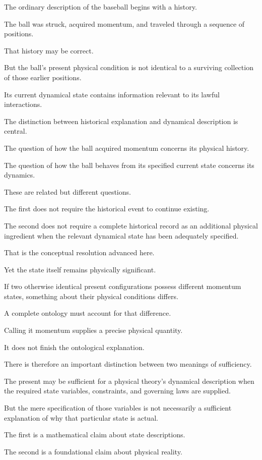 \documentclass[12pt,onecolumn]{article}
\begin{document}
The ordinary description of the baseball begins with a history.

The ball was struck, acquired momentum, and traveled through a sequence of positions.

That history may be correct.

But the ball's present physical condition is not identical to a surviving collection of those earlier positions.

Its current dynamical state contains information relevant to its lawful interactions.

The distinction between historical explanation and dynamical description is central.

The question of how the ball acquired momentum concerns its physical history.

The question of how the ball behaves from its specified current state concerns its dynamics.

These are related but different questions.

The first does not require the historical event to continue existing.

The second does not require a complete historical record as an additional physical ingredient when the relevant dynamical state has been adequately specified.

That is the conceptual resolution advanced here.

Yet the state itself remains physically significant.

If two otherwise identical present configurations possess different momentum states, something about their physical conditions differs.

A complete ontology must account for that difference.

Calling it momentum supplies a precise physical quantity.

It does not finish the ontological explanation.

There is therefore an important distinction between two meanings of sufficiency.

The present may be sufficient for a physical theory's dynamical description when the required state variables, constraints, and governing laws are supplied.

But the mere specification of those variables is not necessarily a sufficient explanation of why that particular state is actual.

The first is a mathematical claim about state descriptions.

The second is a foundational claim about physical reality.
\end{document}
